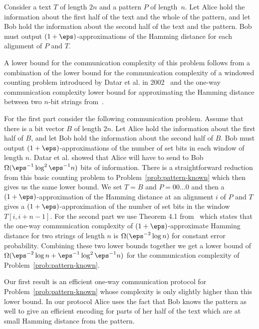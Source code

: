 \begin{problem}\label{prob:pattern-known}
Consider a text $T$ of length $2n$ and a pattern $P$ of length~$n$. Let Alice hold the information about the first half of the text and the whole of the pattern, and let Bob hold the information about the second half of the text and the pattern. Bob must output $(1+\eps)$-approximations of the Hamming distance for each alignment of  $P$ and $T$.
\end{problem}

A lower bound for the communication complexity of this problem follows from a combination of the lower bound for the communication complexity of a windowed counting problem introduced by Datar et al. in 2002~\cite{DGIM:02} and the one-way communication complexity lower bound for approximating the Hamming distance between two $n$-bit strings from~\cite{JW:2013}. 

For the first part consider the following communication problem. Assume that there is a bit vector $B$ of length $2n$.  Let Alice hold the information about the first half of $B$, and let Bob hold the information about the second half of $B$. Bob must output $(1+\eps)$-approximations of the number of set bits in each window of length $n$. Datar et al. showed that 
Alice will have to send to Bob $\Omega (\eps^{-1} \log^2 \eps^{-1} n)$ bits of information. There is a straightforward reduction from this basic counting problem to Problem~\ref{prob:pattern-known} which then gives us the same lower bound. We set $T = B$ and $P = 00 \ldots 0$ and then a $(1+\eps)$-approximation of the Hamming distance at an alignment $i$ of  $P$ and $T$ gives  a $(1+\eps)$-approximation of the number of set bits in the window $T[i, i+ n-1]$. For the second part we use Theorem 4.1 from~\cite{JW:2013} which states that the one-way communication complexity of $(1+\eps)$-approximate Hamming distance for two strings of length $n$ is $\Omega(\eps^{-2} \log{n})$ for constant error probability. 
Combining these two lower bounds together we get a lower bound of $\Omega(\eps^{-2}\log{n} + \eps^{-1}\log^2{\eps^{-1} n})$ for the communication complexity of Problem~\ref{prob:pattern-known}.  

Our first result is an efficient one-way communication protocol for Problem~\ref{prob:pattern-known} whose complexity is only slightly higher than this lower bound.  In our protocol Alice uses the fact that Bob knows the pattern as well to give an efficient encoding for parts of her half of the text which are at small Hamming distance from the pattern.

